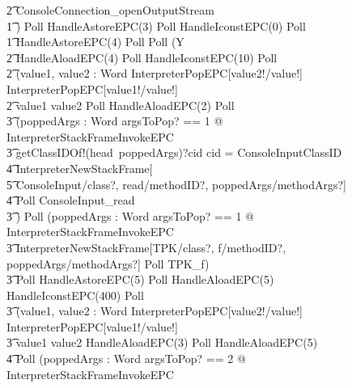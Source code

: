 \begin{figure}[tp!]
{\begin{circus}
    \t2 ConsoleConnection\_openOutputStream \\
    \t1 \circfi) \circseq Poll \circseq HandleAstoreEPC(3) \circseq Poll \circseq HandleIconstEPC(0) \circseq Poll \circseq \\
    \t1 HandleAstoreEPC(4) \circseq Poll \circseq Poll \circseq (\circmu Y \circspot \\
    \t2 HandleAloadEPC(4) \circseq Poll \circseq HandleIconstEPC(10) \circseq Poll \circseq \\
    \t2 (\circvar value1, value2 : Word \circspot \lschexpract InterpreterPopEPC[value2!/value!] \rschexpract \circseq \lschexpract InterpreterPopEPC[value1!/value!] \rschexpract \\
    \t2 \circif value1 \leq value2 \circthen Poll \circseq HandleAloadEPC(2) \circseq Poll \circseq \\
    \t3 (\circvar poppedArgs : \seq Word \circspot \lschexpract \exists argsToPop?  == 1 @ InterpreterStackFrameInvokeEPC \rschexpract \circseq \\
    \t3 getClassIDOf!(head~poppedArgs)?cid \then \circif cid = ConsoleInputClassID \circthen {} \\
    \t4 \lschexpract InterpreterNewStackFrame[ \\
    \t5 ConsoleInput/class?, read/methodID?, poppedArgs/methodArgs?] \rschexpract \circseq \\
    \t4 Poll \circseq ConsoleInput\_read \\
    \t3 \circfi) \circseq Poll \circseq (\circvar poppedArgs : \seq Word \circspot \lschexpract \exists argsToPop? == 1 @ InterpreterStackFrameInvokeEPC \rschexpract \circseq \\
    \t3 \lschexpract InterpreterNewStackFrame[TPK/class?, f/methodID?, poppedArgs/methodArgs?] \rschexpract \circseq Poll \circseq TPK\_f) \circseq \\
    \t3 Poll \circseq HandleAstoreEPC(5) \circseq Poll \circseq HandleAloadEPC(5) \circseq HandleIconstEPC(400) \circseq Poll \circseq \\
    \t3 (\circvar value1, value2 : Word \circspot \lschexpract InterpreterPopEPC[value2!/value!] \rschexpract \circseq \lschexpract InterpreterPopEPC[value1!/value!] \rschexpract \circseq \\
    \t3 \circif value1 \leq value2 \circthen HandleAloadEPC(3) \circseq Poll \circseq HandleAloadEPC(5) \circseq \\
    \t4 Poll \circseq (\circvar poppedArgs : Word \circspot \lschexpract \exists argsToPop? == 2 @ InterpreterStackFrameInvokeEPC \rschexpract \circseq \\

\end{circus}}
\end{figure}
